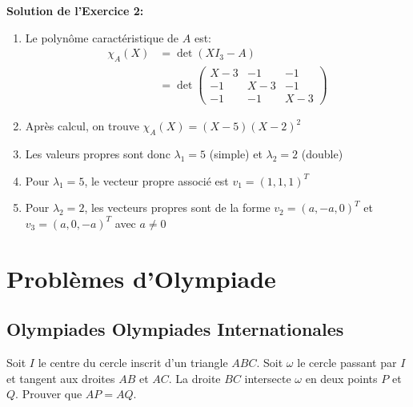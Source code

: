 \documentclass[11pt,%
	fleqn,%
	a4paper,%
	twoside%
]{backagBook}
\def\faTrophy{Olympiades}%
\begin{document}
\begin{solution}
\textbf{Solution de l'Exercice 2:}
\begin{enumerate}
    \item Le polynôme caractéristique de $A$ est:
          \begin{align*}
          \chi_A(X) &= \det(X I_3 - A) \\
          &= \det\begin{pmatrix}
          X-3 & -1 & -1 \\
          -1 & X-3 & -1 \\
          -1 & -1 & X-3
          \end{pmatrix}
          \end{align*}
    \item Après calcul, on trouve $\chi_A(X) = (X-5)(X-2)^2$
    \item Les valeurs propres sont donc $\lambda_1 = 5$ (simple) et $\lambda_2 = 2$ (double)
    \item Pour $\lambda_1 = 5$, le vecteur propre associé est $v_1 = (1,1,1)^T$
    \item Pour $\lambda_2 = 2$, les vecteurs propres sont de la forme $v_2 = (a,-a,0)^T$ et $v_3 = (a,0,-a)^T$ avec $a \neq 0$
\end{enumerate}
\end{solution}


\part{Problèmes d'Olympiade}

\chapterspaceabove{6cm}
\chapter{{\faTrophy} Olympiades Internationales}

\begin{problem}[IMO 2019]
Soit $I$ le centre du cercle inscrit d'un triangle $ABC$. Soit $\omega$ le cercle passant par $I$ et tangent aux droites $AB$ et $AC$. La droite $BC$ intersecte $\omega$ en deux points $P$ et $Q$. Prouver que $AP = AQ$.
\end{problem}
\end{document}

